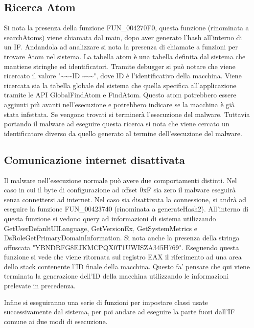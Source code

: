 \documentclass[a4paper,12pt]{article}
\begin{document}
\subsection{Ricerca Atom}
Si nota la presenza della funzione FUN\_004270F0, questa funzione (rinominata a searchAtoms) viene chiamata dal main, dopo aver generato l'hash all'interno di un IF. Andandola ad analizzare si nota la presenza di chiamate a funzioni per trovare Atom nel sistema. La tabella atom è una tabella definita dal sistema che mantiene stringhe ed identificatori. Tramite debugger si può notare che viene ricercato il valore "\textasciitilde\textasciitilde\textasciitilde ID \textasciitilde\textasciitilde\textasciitilde", dove ID è l'identificativo della macchina. Viene ricercata sia la tabella globale del sistema che quella specifica all'applicazione tramite le API GlobalFindAtom e FindAtom. 
Questo atom potrebbero essere aggiunti più avanti nell'esecuzione e potrebbero indicare se la macchina è già stata infettata. Se vengono trovati si terminerà l'esecuzione del malware. Tuttavia portando il malware ad eseguire questa ricerca si nota che viene cercato un identificatore diverso da quello generato al termine dell'esecuzione del malware.


\subsection{Comunicazione internet disattivata}
Il malware nell'esecuzione normale può avere due comportamenti distinti. Nel caso in cui il byte di configurazione ad offset 0xF sia zero il malware eseguirà senza connettersi ad internet. 
Nel caso sia disattivata la connessione, si andrà ad eseguire la funzione FUN\_00423740 (rinominata a generateHash2). All'interno di questa funzione si vedono query ad informazioni di sistema utilizzando GetUserDefaultUILanguage, GetVersionEx, GetSystemMetrics e DsRoleGetPrimaryDomainInformation. Si nota anche la presenza della stringa offuscata "YBNDRFG8EJKMCPQX0T1UWISZA345H769". Eseguendo questa funzione si vede che viene ritornata sul registro EAX il riferimento ad una area dello stack contenente l'ID finale della macchina. Questo fa' pensare che qui viene terminata la generazione dell'ID della macchina utilizzando le informazioni prelevate in precedenza.

Infine si eseguiranno una serie di funzioni per impostare classi usate successivamente dal sistema, per poi andare ad eseguire la parte fuori dall'IF comune ai due modi di esecuzione.  
\end{document}
